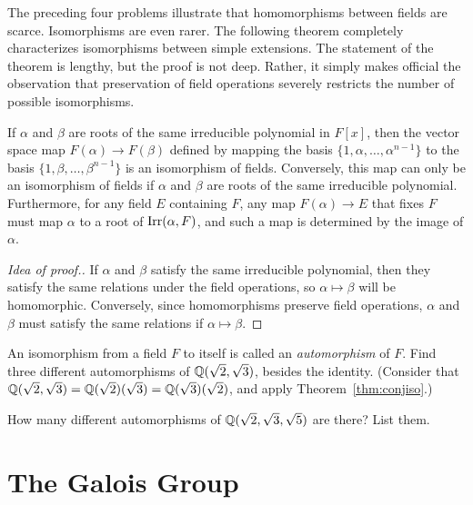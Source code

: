 The preceding four problems illustrate that homomorphisms between fields are scarce. Isomorphisms are even rarer. The following theorem completely characterizes isomorphisms between simple extensions. The statement of the theorem is lengthy, but the proof is not deep. Rather, it simply makes official the observation that preservation of field operations severely restricts the number of possible isomorphisms.

\begin{theorem}\label{thm:conjiso}
If $\alpha$ and $\beta$ are roots of the same irreducible polynomial in $F[x]$, then the vector space map $F(\alpha) \longrightarrow F(\beta)$ defined by mapping the basis $\{1, \alpha, \ldots, \alpha^{n-1}\}$ to the basis $\{1, \beta, \ldots, \beta^{n-1}\}$ is an isomorphism of fields.  Conversely, this map can only be an isomorphism of fields if $\alpha$ and $\beta$ are roots of the same irreducible polynomial.  Furthermore, for any field $E$ containing $F$, any map $F(\alpha) \longrightarrow E$ that fixes $F$ must map $\alpha$ to a root of $\operatorname{Irr}(\alpha,F)$, and such a map is determined by the image of $\alpha$.
\end{theorem}

\begin{proof}[Idea of proof.] If $\alpha$ and $\beta$ satisfy the same irreducible polynomial, then they satisfy the same relations under the field operations, so $\alpha \mapsto \beta$ will be homomorphic. Conversely, since homomorphisms preserve field operations, $\alpha$ and $\beta$ must satisfy the same relations if $\alpha \mapsto \beta$.
\end{proof}

\begin{problem}
    An isomorphism from a field $F$ to itself is called an \textit{automorphism} of $F$. Find three different automorphisms of $\mathbb{Q}(\sqrt{2},\sqrt{3})$, besides the identity. (Consider that $\mathbb{Q}(\sqrt{2},\sqrt{3})=\mathbb{Q}(\sqrt{2})(\sqrt{3})=\mathbb{Q}(\sqrt{3})(\sqrt{2})$, and apply Theorem~\ref{thm:conjiso}.)
\end{problem}



\begin{problem}
    How many different automorphisms of $\mathbb{Q}(\sqrt{2},\sqrt{3},\sqrt{5})$ are there? List them.
\end{problem}

\section{The Galois Group}

